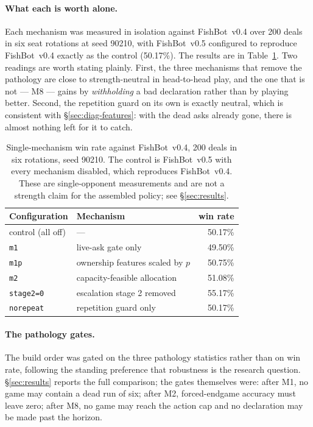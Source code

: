\documentclass[11pt]{article}
\theoremstyle{definition}
\DeclareRobustCommand{\vfive}{\texorpdfstring{\mbox{FishBot v0.5}}{FishBot v0.5}}
\DeclareRobustCommand{\vfour}{\texorpdfstring{\mbox{FishBot v0.4}}{FishBot v0.4}}
\providecommand{\numMechDeals}{200}
\providecommand{\numMechSeed}{90210}
\providecommand{\numControlWin}{50.17}
\providecommand{\numMoneAlone}{49.50}
\providecommand{\numMonePAlone}{50.75}
\providecommand{\numMtwoAlone}{51.08}
\providecommand{\numMeightAlone}{55.17}
\providecommand{\numGuardAlone}{50.17}
\begin{document}
\paragraph{What each is worth alone.} Each mechanism was measured in isolation
against \vfour{} over \numMechDeals{} deals in six seat rotations at seed
\numMechSeed{}, with \vfive{} configured to reproduce \vfour{} exactly as the
control (\numControlWin\%). The results are in Table~\ref{tab:mechanisms}. Two
readings are worth stating plainly. First, the three mechanisms that remove the
pathology are close to strength-neutral in head-to-head play, and the one that is
not --- M8 --- gains by \emph{withholding} a bad declaration rather than by
playing better. Second, the repetition guard on its own is exactly neutral, which
is consistent with \S\ref{sec:diag-features}: with the dead asks already gone,
there is almost nothing left for it to catch.

\begin{table}[t]
\centering
\caption{Single-mechanism win rate against \vfour{}, \numMechDeals{} deals in six
rotations, seed \numMechSeed{}. The control is \vfive{} with every mechanism
disabled, which reproduces \vfour{}. These are single-opponent measurements and
are not a strength claim for the assembled policy; see \S\ref{sec:results}.}
\label{tab:mechanisms}
\begin{tabular}{llr}
\toprule
\textbf{Configuration} & \textbf{Mechanism} & \textbf{win rate} \\
\midrule
control (all off)       & ---                                & \numControlWin\% \\
\texttt{m1}             & live-ask gate only                 & \numMoneAlone\% \\
\texttt{m1p}            & ownership features scaled by $p$   & \numMonePAlone\% \\
\texttt{m2}             & capacity-feasible allocation       & \numMtwoAlone\% \\
\texttt{stage2=0}       & escalation stage 2 removed         & \numMeightAlone\% \\
\texttt{norepeat}       & repetition guard only              & \numGuardAlone\% \\
\bottomrule
\end{tabular}
\end{table}

\paragraph{The pathology gates.} The build order was gated on the three pathology
statistics rather than on win rate, following the standing preference that
robustness is the research question. \S\ref{sec:results} reports the full
comparison; the gates themselves were: after M1, no game may contain a dead run
of six; after M2, forced-endgame accuracy must leave zero; after M8, no game may
reach the action cap and no declaration may be made past the horizon.
\end{document}
